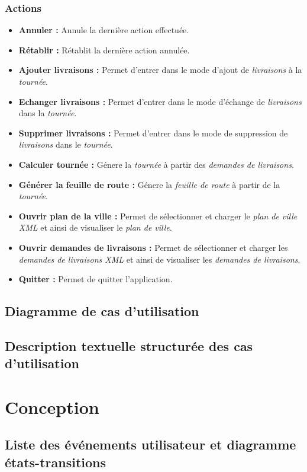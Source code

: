 \documentclass[10pt,a4paper]{book}
\begin{document}
\subsection{Actions}
\begin{itemize}
\item \textbf{Annuler :} Annule la dernière action effectuée. \vskip1mm
\item \textbf{Rétablir :} Rétablit la dernière action annulée. \vskip1mm
\item \textbf{Ajouter livraisons :} Permet d'entrer dans le mode d'ajout de \textit{livraisons} à la \textit{tournée}. \vskip1mm
\item \textbf{Echanger livraisons :} Permet d'entrer dans le mode d'échange de \textit{livraisons} dans la \textit{tournée}. \vskip1mm
\item \textbf{Supprimer livraisons :} Permet d'entrer dans le mode de suppression de \textit{livraisons} dans le \textit{tournée}. \vskip1mm
\item \textbf{Calculer tournée :} Génere la \textit{tournée} à partir des \textit{demandes de livraisons}. \vskip1mm
\item \textbf{Générer la feuille de route :} Génere la \textit{feuille de route} à partir de la \textit{tournée}. \vskip1mm
\item \textbf{Ouvrir plan de la ville :} Permet de sélectionner et charger le \textit{plan de ville XML} et ainsi de visualiser le \textit{plan de ville}. \vskip1mm
\item \textbf{Ouvrir demandes de livraisons :} Permet de sélectionner et charger les \textit{demandes de livraisons XML} et ainsi de visualiser les \textit{demandes de livraisons}. \vskip1mm
\item \textbf{Quitter :} Permet de quitter l'application. \vskip1mm
\end{itemize}
\section{Diagramme de cas d'utilisation}
\section{Description textuelle structurée des cas d'utilisation}
\chapter{Conception}
\section{Liste des événements utilisateur et diagramme états-transitions}
\end{document}
